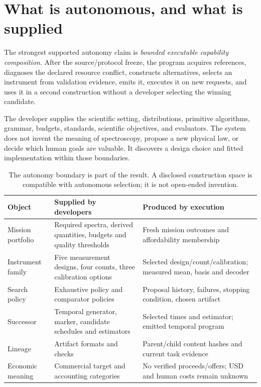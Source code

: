 \documentclass[11pt,a4paper]{article}
\begin{document}
\section{What is autonomous, and what is supplied}

The strongest supported autonomy claim is \emph{bounded executable capability composition}. After the source/protocol freeze, the program acquires references, diagnoses the declared resource conflict, constructs alternatives, selects an instrument from validation evidence, emits it, executes it on new requests, and uses it in a second construction without a developer selecting the winning candidate.

The developer supplies the scientific setting, distributions, primitive algorithms, grammar, budgets, standards, scientific objectives, and evaluators. The system does not invent the meaning of spectroscopy, propose a new physical law, or decide which human goals are valuable. It discovers a design choice and fitted implementation within those boundaries.

\begin{table}[htbp]
\centering
\small
\begin{tabularx}{\textwidth}{@{}p{}XX@{}}
\toprule
Object & Supplied by developers & Produced by execution\\
\midrule
Mission portfolio & Required spectra, derived quantities, budgets and quality thresholds & Fresh mission outcomes and affordability membership\\
Instrument family & Five measurement designs, four counts, three calibration options & Selected design/count/calibration; measured mean, basis and decoder\\
Search policy & Exhaustive policy and comparator policies & Proposal history, failures, stopping condition, chosen artifact\\
Successor & Temporal generator, marker, candidate schedules and estimators & Selected times and estimator; emitted temporal program\\
Lineage & Artifact formats and checks & Parent/child content hashes and current task evidence\\
Economic meaning & Commercial target and accounting categories & No verified proceeds/offers; USD and human costs remain unknown\\
\bottomrule
\end{tabularx}
\caption{The autonomy boundary is part of the result. A disclosed construction space is compatible with autonomous selection; it is not open-ended invention.}
\end{table}
\end{document}
